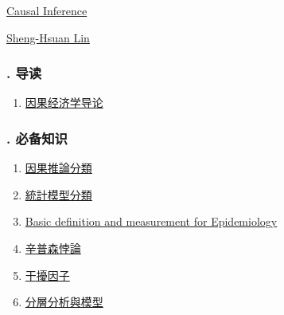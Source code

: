 \documentclass[11pt]{article}
\begin{document}
	\kaishu 
	\setcounter{section}{0}
	\begin{center}
		{\LARGE  \href{https://shenghsuanlin.web.nycu.edu.tw/wp-content/uploads/sites/349/2022/09/Syllabus.pdf}{Causal Inference}}
		
		
		{\large \href{https://shenghsuanlin.web.nycu.edu.tw/}{Sheng-Hsuan Lin}}
	\end{center}
\setcounter{page}{1}



\vspace{-1cm}

\subsubsection*{. 导读}

\vspace{-0.5cm}

\begin{enumerate}
	\item \href{https://mp.weixin.qq.com/s/GRRr4QLAyD6dl-DqSXUppA}{因果经济学导论}	%
\end{enumerate}

\vspace{-1cm}

\subsubsection*{. 必备知识}

\vspace{-0.5cm}

\begin{enumerate}
	\item \href{https://mp.weixin.qq.com/s/_4459wttNLq4Ug4iPMNuyQ}{因果推論分類}	%
	\item \href{https://mp.weixin.qq.com/s/uNK3o0KsPv4NoVp1vDiZvA}{統計模型分類}	%
	\item \href{https://mp.weixin.qq.com/s/vFPrBpP47TYifWgaqA0QLg}{Basic definition and measurement for Epidemiology}	%
	\item \href{https://mp.weixin.qq.com/s/y40XDRGrVoIgcCCYtAn80A}{辛普森悖論}	%
	\item \href{https://mp.weixin.qq.com/s/RTbZ2oePbaL9Lx2UhosjAw}{干擾因子}	%
	\item \href{https://mp.weixin.qq.com/s/s2HTAYpsZt-JRUaMreC-yg}{分層分析與模型}	%
\end{enumerate}
\end{document}
